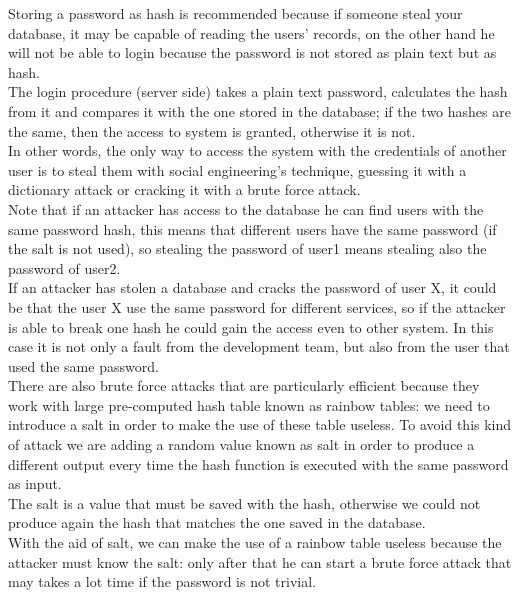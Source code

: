 Storing a password as hash is recommended because if someone steal your database, it may be capable of reading the users’ records, on the other hand he will not be able to login because the password is not stored as plain text but as hash.\\
The login procedure (server side) takes a plain text password, calculates the hash from it and compares it with the one stored in the database; if the two hashes are the same, then the access to system is granted, otherwise it is not.\\
In other words, the only way to access the system with the credentials of another user is to steal them with social engineering’s technique, guessing it with a dictionary attack or cracking it with a brute force attack.\\
Note that if an attacker has access to the database he can find users with the same password hash, this means that different users have the same password (if the salt is not used), so stealing the password of user1 means stealing also the password of user2.\\
If an attacker has stolen a database and cracks the password of user X, it could be that the user X use the same password for different services, so if the attacker is able to break one hash he could gain the access even to other system. In this case it is not only a fault from the development team, but also from the user that used the same password.\\
There are also brute force attacks that are particularly efficient because they work with large pre-computed hash table known as rainbow tables: we need to introduce a salt in order to make the use of these table useless.
To avoid this kind of attack we are adding a random value known as salt in order to produce a different output every time the hash function is executed with the same password as input.\\
The salt is a value that must be saved with the hash, otherwise we could not produce again the hash that matches the one saved in the database.\\
With the aid of salt, we can make the use of a rainbow table useless because the attacker must know the salt: only after that he can start a brute force attack that may takes a lot time if the password is not trivial.\\

